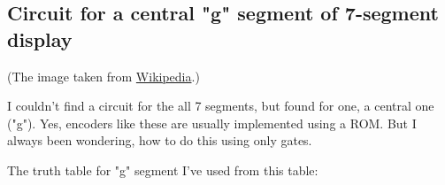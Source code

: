 \subsection{Circuit for a central "g" segment of 7-segment display}

\begin{figure}[H]
\centering
{}
\end{figure}

(The image taken from \href{https://commons.wikimedia.org/wiki/File:7-segment_labeled.svg}{Wikipedia}.)

I couldn't find a circuit for the all 7 segments, but found for one, a central one ("g").
Yes, encoders like these are usually implemented using a ROM.
But I always been wondering, how to do this using only gates.

The truth table for "g" segment I've used from this table:

\begin{figure}[H]
\centering
{}
\end{figure}

